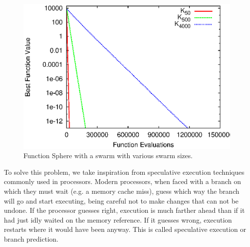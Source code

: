 \documentclass[journal,letterpaper]{IEEEtran}
\begin{document}
\begin{figure}
  \centering
  \includegraphics[width=.8\columnwidth]{evals_sphere.eps}
  \caption{Function Sphere with a swarm with various swarm sizes.}
  \label{fig:evals-sphere}
\end{figure}

To solve this problem, we take inspiration from speculative execution
techniques commonly used in processors.  Modern processors, when faced with a
branch on which they must wait (e.g. a memory cache miss), guess which way the
branch will go and start executing, being careful not to make changes that can not be undone.
If the processor guesses right, execution
is much farther ahead than if it had just idly waited on the memory reference.  If it
guesses wrong, execution restarts where it would have been anyway.
This is called speculative execution or branch prediction.
\end{document}

